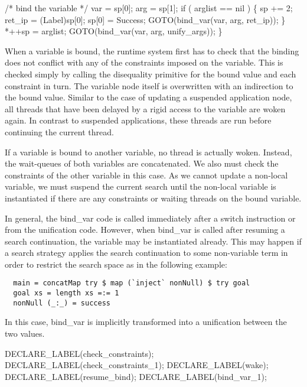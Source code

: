     /* bind the variable */
    var = sp[0];
    arg = sp[1];
    if ( arglist == nil )
    \{
        sp    += 2;
        ret_ip = (Label)sp[0];
        sp[0]  = Success;
        GOTO(bind_var(var, arg, ret_ip));
    \}
    *++sp = arglist;
    GOTO(bind_var(var, arg, unify_args));
\}

\nwendcode{}\nwdocspar
When a variable is bound, the runtime system first has to check that
the binding does not conflict with any of the constraints imposed on
the variable. This is checked simply by calling the disequality
primitive for the bound value and each constraint in turn. The
variable node itself is overwritten with an indirection to the bound
value. Similar to the case of updating a suspended application node,
all threads that have been delayed by a rigid access to the variable
are woken again. In contrast to suspended applications, these threads
are run before continuing the current thread.

If a variable is bound to another variable, no thread is actually
woken. Instead, the wait-queues of both variables are concatenated. We
also must check the constraints of the other variable in this case.
As we cannot update a non-local variable, we must suspend the current
search until the non-local variable is instantiated if there are any
constraints or waiting threads on the bound variable.

In general, the {\Tt{}bind{\_}var\nwendquote} code is called immediately after a switch
instruction or from the unification code. However, when {\Tt{}bind{\_}var\nwendquote}
is called after resuming a search continuation, the variable may be
instantiated already. This may happen if a search strategy applies the
search continuation to some non-variable term in order to restrict the
search space as in the following example:
\begin{verbatim}
  main = concatMap try $ map (`inject` nonNull) $ try goal 
  goal xs = length xs =:= 1
  nonNull (_:_) = success
\end{verbatim}
In this case, {\Tt{}bind{\_}var\nwendquote} is implicitly transformed into a
unification between the two values.

\nwenddocs{}\plusendmoddef\nwstartdeflinemarkup{}\nwenddeflinemarkup
DECLARE_LABEL(check_constraints);
DECLARE_LABEL(check_constraints_1);
DECLARE_LABEL(wake);
DECLARE_LABEL(resume_bind);
DECLARE_LABEL(bind_var_1);

